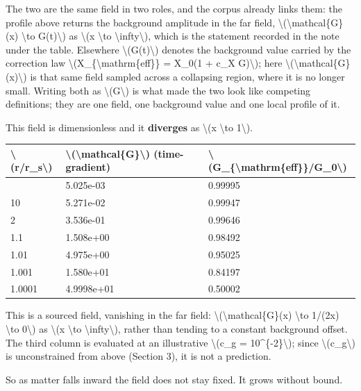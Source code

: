 \documentclass[
  10pt,
]{article}
\begin{document}
The two are the same field in two roles, and the corpus already links
them: the profile above returns the background amplitude in the far
field, \textbackslash(\textbackslash mathcal\{G\}(x) \textbackslash to
G(t)\textbackslash) as \textbackslash(x \textbackslash to
\textbackslash infty\textbackslash), which is the statement recorded in
the note under the table. Elsewhere \textbackslash(G(t)\textbackslash)
denotes the background value carried by the correction law
\textbackslash(X\_\{\textbackslash mathrm\{eff\}\} = X\_0(1 + c\_X
G)\textbackslash); here
\textbackslash(\textbackslash mathcal\{G\}(x)\textbackslash) is that
same field sampled across a collapsing region, where it is no longer
small. Writing both as \textbackslash(G\textbackslash) is what made the
two look like competing definitions; they are one field, one background
value and one local profile of it.

This field is dimensionless and it \textbf{diverges} as \textbackslash(x
\textbackslash to 1\textbackslash).

\begin{longtable}[]{@{}lll@{}}
\toprule\noalign{}
\textbackslash(r/r\_s\textbackslash) &
\textbackslash(\textbackslash mathcal\{G\}\textbackslash)
(time-gradient) &
\textbackslash(G\_\{\textbackslash mathrm\{eff\}\}/G\_0\textbackslash) \\
\midrule\noalign{}
\endhead
\bottomrule\noalign{}
\endlastfoot
100 & 5.025e-03 & 0.99995 \\
10 & 5.271e-02 & 0.99947 \\
2 & 3.536e-01 & 0.99646 \\
1.1 & 1.508e+00 & 0.98492 \\
1.01 & 4.975e+00 & 0.95025 \\
1.001 & 1.580e+01 & 0.84197 \\
1.0001 & 4.9998e+01 & 0.50002 \\
\end{longtable}

This is a sourced field, vanishing in the far field:
\textbackslash(\textbackslash mathcal\{G\}(x) \textbackslash to 1/(2x)
\textbackslash to 0\textbackslash) as \textbackslash(x \textbackslash to
\textbackslash infty\textbackslash), rather than tending to a constant
background offset. The third column is evaluated at an illustrative
\textbackslash(c\_g = 10\^{}\{-2\}\textbackslash); since
\textbackslash(c\_g\textbackslash) is unconstrained from above (Section
3), it is not a prediction.

So as matter falls inward the field does not stay fixed. It grows
without bound.
\end{document}
